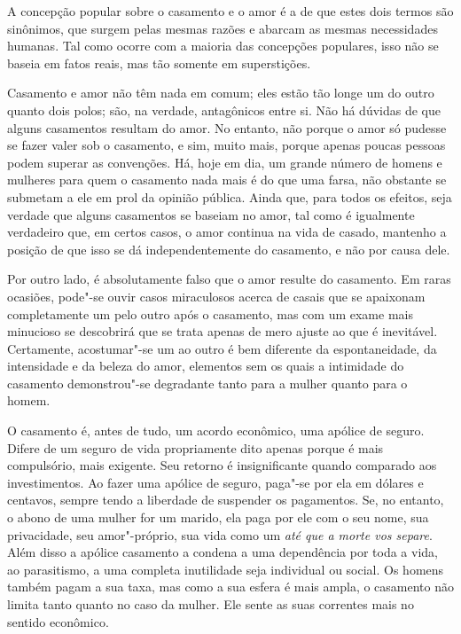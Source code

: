 \begin{multicols}{2}
\noindent{}A concepção popular sobre o casamento e o amor é a de que estes dois
termos são sinônimos, que surgem pelas mesmas razões e abarcam as mesmas
necessidades humanas. Tal como ocorre com a maioria das concepções
populares, isso não se baseia em fatos reais, mas tão somente em
superstições.

Casamento e amor não têm nada em comum; eles estão tão longe um do outro
quanto dois polos; são, na verdade, antagônicos entre si. Não há dúvidas
de que alguns casamentos resultam do amor. No entanto, não porque o
amor só pudesse se fazer valer sob o casamento, e sim, muito mais,
porque apenas poucas pessoas podem superar as convenções. Há, hoje em
dia, um grande número de homens e mulheres para quem o casamento nada
mais é do que uma farsa, não obstante se submetam a ele em prol da
opinião pública. Ainda que, para todos os efeitos, seja verdade que
alguns casamentos se baseiam no amor, tal como é igualmente verdadeiro
que, em certos casos, o amor continua na vida de casado, mantenho
a posição de que isso se dá independentemente do casamento, e
não por causa dele.

Por outro lado, é absolutamente falso que o amor resulte do casamento.
Em raras ocasiões, pode"-se ouvir casos miraculosos acerca de casais que
se apaixonam completamente um pelo outro após o casamento, mas com um
exame mais minucioso se descobrirá que se trata apenas de mero ajuste ao
que é inevitável. Certamente, acostumar"-se um ao outro é bem diferente
da espontaneidade, da intensidade e da beleza do amor, elementos sem os
quais a intimidade do casamento demonstrou"-se degradante tanto para a
mulher quanto para o homem.

\vspace{\baselineskip}
{\small{}}
\vspace{\baselineskip}

O casamento é, antes de tudo, um acordo econômico, uma apólice de
seguro. Difere de um seguro de vida propriamente dito apenas porque é
mais compulsório, mais exigente. Seu retorno é insignificante quando
comparado aos investimentos. Ao fazer uma apólice de seguro, paga"-se por
ela em dólares e centavos, sempre tendo a liberdade de suspender os
pagamentos. Se, no entanto, o abono de uma mulher for um marido, ela
paga por ele com o seu nome, sua privacidade, seu amor"-próprio, sua vida
como um \textit{até que a morte vos separe}. Além disso a apólice
casamento a condena a uma dependência por toda a vida, ao parasitismo, a
uma completa inutilidade seja individual ou social. Os homens também
pagam a sua taxa, mas como a sua esfera é mais ampla, o casamento não
limita tanto quanto no caso da mulher. Ele sente as suas correntes mais
no sentido econômico.


\end{multicols}
